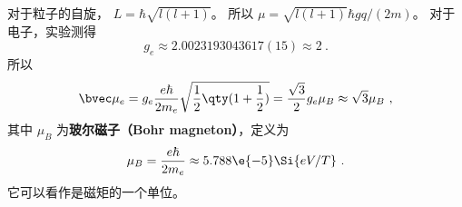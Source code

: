 对于粒子的自旋， $L = \hbar \sqrt{l(l + 1)} $。 所以 $\mu = \sqrt{l (l + 1)} \hbar gq/(2m)$。 
对于电子，实验测得
\begin{equation}
g_e \approx 2.0023193043617(15) \approx 2~.
\end{equation}
所以
\begin{equation}
\bvec \mu_e  = g_e \frac{e\hbar}{2 m_e} \sqrt{\frac12 \qty(1 + \frac12)}  = \frac{\sqrt 3}{2} g_e \mu_B \approx \sqrt 3 \mu_B~,
\end{equation}
其中 $\mu_B$ 为\textbf{玻尔磁子（Bohr magneton）}，定义为
\begin{equation}
\mu_B = \frac{e\hbar}{2 m_e} \approx 5.788\e{-5} \Si{eV/T}~.
\end{equation}
它可以看作是磁矩的一个单位。
